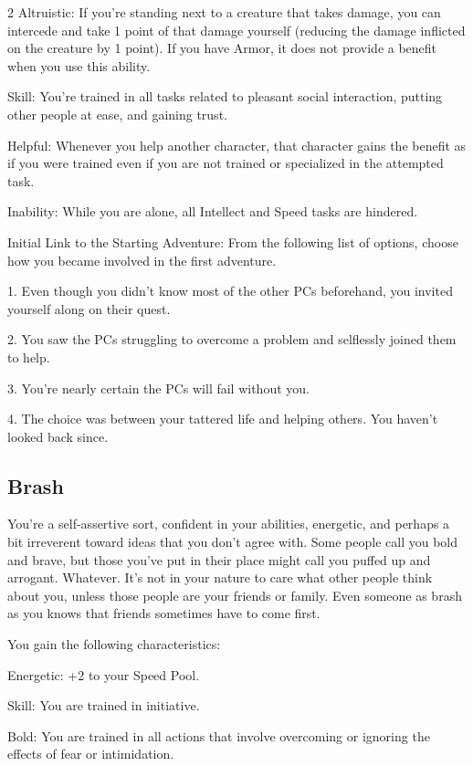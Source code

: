 \begin{multicols}{2}
Altruistic: If you’re standing next to a creature that takes damage, you can intercede and take 1 point of that damage yourself (reducing the damage inflicted on the creature by 1 point). If you have Armor, it does not provide a benefit when you use this ability.

Skill: You’re trained in all tasks related to pleasant social interaction, putting other people at ease, and gaining trust.

Helpful: Whenever you help another character, that character gains the benefit as if you were trained even if you are not trained or specialized in the attempted task.

Inability: While you are alone, all Intellect and Speed tasks are hindered.

Initial Link to the Starting Adventure: From the following list of options, choose how you became involved in the first adventure.

1. Even though you didn’t know most of the other PCs beforehand, you invited yourself along on their quest.

2. You saw the PCs struggling to overcome a problem and selflessly joined them to help.

3. You’re nearly certain the PCs will fail without you.

4. The choice was between your tattered life and helping others. You haven’t looked back since.

\subsection{Brash}

You’re a self-assertive sort, confident in your abilities, energetic, and perhaps a bit irreverent toward ideas that you don’t agree with. Some people call you bold and brave, but those you’ve put in their place might call you puffed up and arrogant. Whatever. It’s not in your nature to care what other people think about you, unless those people are your friends or family. Even someone as brash as you knows that friends sometimes have to come first.

You gain the following characteristics:

Energetic: +2 to your Speed Pool.

Skill: You are trained in initiative.

Bold: You are trained in all actions that involve overcoming or ignoring the effects of fear or intimidation.


\end{multicols}
